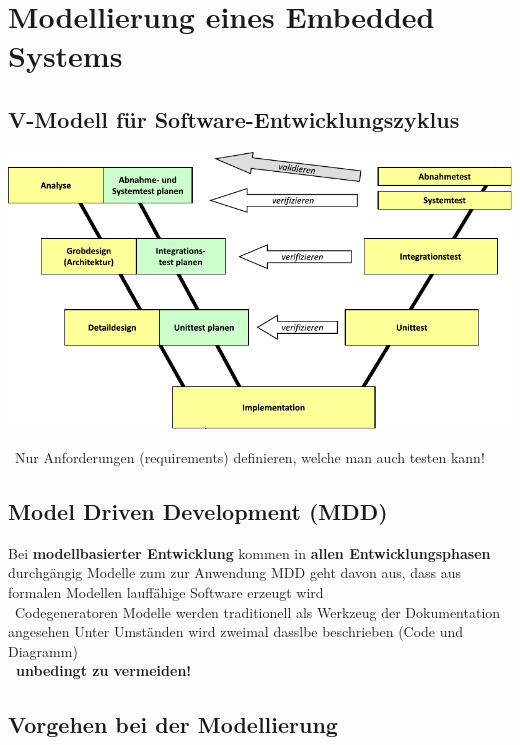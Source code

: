 \section{Modellierung eines Embedded Systems}

\subsection{V-Modell für Software-Entwicklungszyklus}

\begin{center}
    \includegraphics[width=0.8\columnwidth]{images/V_modell.pdf}
\end{center}

\textrightarrow\ Nur Anforderungen (requirements) definieren, welche man auch testen kann!


\subsection{Model Driven Development (MDD)}

\begin{outline}
    \1 Bei \textbf{modellbasierter Entwicklung} kommen in \textbf{allen Entwicklungsphasen} durchgängig Modelle zum zur Anwendung
    \1 MDD geht davon aus, dass aus formalen Modellen lauffähige Software erzeugt wird \\
        \textrightarrow\ Codegeneratoren
    \1 Modelle werden traditionell als Werkzeug der Dokumentation angesehen
        \2 Unter Umständen wird zweimal dasslbe beschrieben (Code und Diagramm) \\
            \textbf{\textrightarrow\ unbedingt zu vermeiden!}
\end{outline}


\subsection{Vorgehen bei der Modellierung}


